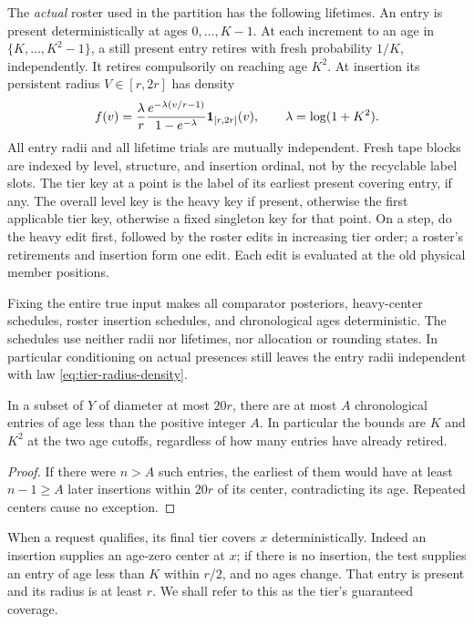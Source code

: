 The \emph{actual} roster used in the partition has the following lifetimes.
An entry is present deterministically at ages \(0,\ldots,K-1\).  At each
increment to an age in \(\{K,\ldots,K^2-1\}\), a still present entry
retires with fresh probability \(1/K\), independently.  It retires
compulsorily on reaching age \(K^2\).  At insertion its persistent radius
\(V\in[r,2r]\) has density
\begin{equation}\label{eq:tier-radius-density}
 f(v)=\frac{\lambda}{r}
       \frac{e^{-\lambda(v/r-1)}}{1-e^{-\lambda}}
       \mathbf 1_{[r,2r]}(v),
 \qquad \lambda=\log(1+K^2).
\end{equation}
All entry radii and all lifetime trials are mutually independent.  Fresh
tape blocks are indexed by level, structure, and insertion ordinal, not
by the recyclable label slots.  The tier key at a point is the label of
its earliest present covering entry,
if any.  The overall level key is the heavy key if present, otherwise
the first applicable tier key, otherwise a fixed singleton key for that
point.  On a step, do the heavy edit first, followed by the roster edits
in increasing tier order; a roster's retirements and insertion form one
edit.  Each edit is evaluated at the old physical member positions.

Fixing the entire true input makes all comparator posteriors, heavy-center
schedules, roster insertion schedules, and chronological ages deterministic.
The schedules use neither radii nor lifetimes, nor allocation or rounding
states.  In particular conditioning on actual presences still leaves the
entry radii independent with law \eqref{eq:tier-radius-density}.

\begin{lemma}\label{lem:roster-count}
In a subset of \(Y\) of diameter at most \(20r\), there are at most
\(A\) chronological entries of age less than the positive integer \(A\).
In particular the bounds are \(K\) and \(K^2\) at the two age cutoffs,
regardless of how many entries have already retired.
\end{lemma}
\begin{proof}
If there were \(n>A\) such entries, the earliest of them would have
at least \(n-1\ge A\) later insertions within \(20r\) of its center,
contradicting its age.  Repeated centers cause no exception.
\end{proof}

When a request qualifies, its final tier covers \(x\) deterministically.
Indeed an insertion supplies an age-zero center at \(x\); if there is
no insertion, the test supplies an entry of age less than \(K\) within
\(r/2\), and no ages change.  That entry is present and its radius is
at least \(r\).  We shall refer to this as the tier's guaranteed coverage.

